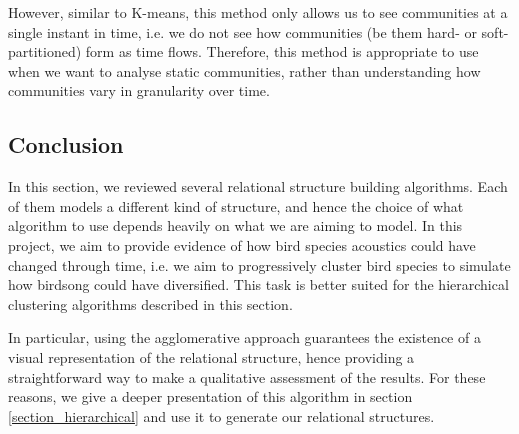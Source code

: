 \documentclass[../main.tex]{subfiles} \label{chapter_soa}
\begin{document}
\par However, similar to K-means, this method only allows us to see communities at a single instant in time, i.e. we do not see how communities (be them hard- or soft-partitioned) form as time flows. Therefore, this method is appropriate to use when we want to analyse static communities, rather than understanding how communities vary in granularity over time.

\subsection{Conclusion}
In this section, we reviewed several relational structure building algorithms. Each of them models a different kind of structure, and hence the choice of what algorithm to use depends heavily on what we are aiming to model. In this project, we aim to provide evidence of how bird species acoustics could have changed through time, i.e. we aim to progressively cluster bird species to simulate how birdsong could have diversified. This task is better suited for the hierarchical clustering algorithms described in this section. 
\par In particular, using the agglomerative approach guarantees the existence of a visual representation of the relational structure, hence providing a straightforward way to make a qualitative assessment of the results. For these reasons, we give a deeper presentation of this algorithm in section \ref{section_hierarchical} and use it to generate our relational structures.
\end{document}
